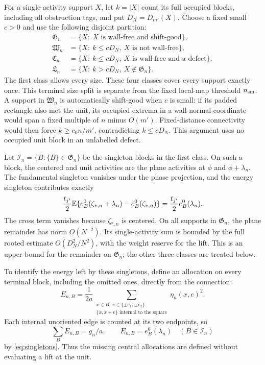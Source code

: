 For a single-activity support \(X\), let \(k=|X|\) count its full
occupied blocks, including all obstruction tags, and put
\(D_X=D_{m'}(X)\).  Choose a fixed small \(c>0\) and use the following disjoint partition:
\begin{equation}\label{obs:terminal-partition}
\begin{split}
 \mathfrak G_n&=\{X:\ X\text{ is wall-free and shift-good}\},\\
 \mathfrak W_n&=\{X:\ k\le cD_N,\ X\text{ is not wall-free}\},\\
 \mathfrak C_n&=\{X:\ k\le cD_N,\ X\text{ is wall-free and a defect}\},\\
 \mathfrak L_n&=\{X:\ k>cD_N,\ X\notin\mathfrak G_n\}.
\end{split}
\end{equation}
The first class allows every size.  These four classes cover every
support exactly once.  This terminal size split is separate from the
fixed local-map threshold \(n_{\rm sm}\).  A support in
\(\mathfrak W_n\) is automatically shift-good when \(c\) is small:
if its padded rectangle also met the unit, its occupied extrema in
a wall-normal coordinate would span a fixed multiple of \(n\) minus
\(O(m')\).  Fixed-distance connectivity would then force
\(k\ge c_0n/m'\), contradicting \(k\le cD_N\).  This argument uses
no occupied unit block in an unlabelled defect.

Let \(\mathcal I_n=\{B:\{B\}\in\mathfrak G_n\}\) be the singleton
blocks in the first class.  On such a block, the centered and unit
activities are the plane activities at \(\phi\) and
\(\phi+\lambda_n\).  The fundamental singleton vanishes under the
phase projection, and the energy singleton contributes exactly
\[
 \frac{t_{j'}}2
  \mathbb E\{e_B^0(\zeta_{*,n}+\lambda_n)-e_B^0(\zeta_{*,n})\}
                    =\frac{t_{j'}}2e_B^0(\lambda_n).
\]
The cross term vanishes because \(\zeta_{*,n}\) is centered.  On all
supports in \(\mathfrak G_n\), the plane remainder has norm
\(O(N^{-2})\).  Its single-activity sum is bounded by the full
rooted estimate \(O(D_N^2/N^2)\), with the weight reserve for the
lift.  This is an upper bound for the remainder on
\(\mathfrak G_n\); the other three classes are treated below.

To identify the energy left by these singletons, define an allocation
on every terminal block, including the omitted ones, directly from
the connection:
\begin{equation}\label{obs:endpoint-allocation}
 E_{n,B}=\frac1{2a}
   \sum_{\substack{x\in B,\ e\in\{\pm e_1,\pm e_2\}\\
                   \{x,x+e\}\text{ internal to the square}}}
                      \eta_n(x,e)^2.
\end{equation}
Each internal unoriented edge is counted at its two endpoints, so
\[
       \sum_B E_{n,B}=g_n/a,\qquad
       E_{n,B}=e_B^0(\lambda_n)\quad(B\in\mathcal I_n)
\]
by \eqref{eq:singletons}.  Thus the missing central allocations are
defined without evaluating a lift at the unit.

